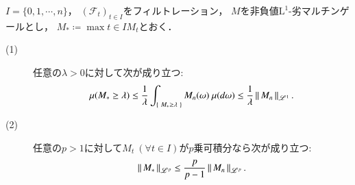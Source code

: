 	\begin{screen}
		\begin{thm}[Doobの不等式(1)]
			$I=\{0,1,\cdots,n\}$，
			$(\mathcal{F}_t)_{t \in I}$をフィルトレーション，
			$M$を非負値$\mathrm{L}^1$-劣マルチンゲールとし，
			$M_* \coloneqq \max{t \in I}{M_t}$とおく．
			\begin{description}
				\item[(1)] 任意の$\lambda > 0$に対して次が成り立つ:
					\begin{align}
						\mu(M_* \geq \lambda) \leq \frac{1}{\lambda} \int_{\left\{\ M_* \geq \lambda\ \right\}} M_n(\omega)\ \mu(d\omega)
						\leq \frac{1}{\lambda} \left\|\, M_n\, \right\|_{\mathscr{L}^1}.
					\end{align}
				\item[(2)] 任意の$p > 1$に対して$M_t\ (\forall t \in I)$が$p$乗可積分なら次が成り立つ:
					\begin{align}
						\left\|\, M_*\, \right\|_{\mathscr{L}^p} \leq \frac{p}{p-1} \left\|\, M_n\, \right\|_{\mathscr{L}^p}.
						\label{eq:thm_Doob_ineq_1_0}
					\end{align}
			\end{description}
			\label{thm:Doob_inequality_1}
		\end{thm}
	\end{screen}
	
